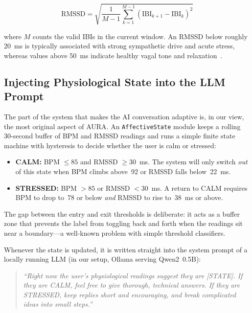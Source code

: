 \documentclass[conference]{IEEEtran}
\begin{document}
\begin{equation}
\label{eq:rmssd}
\text{RMSSD} = \sqrt{\frac{1}{M-1} \sum_{k=1}^{M-1}
  \left(\text{IBI}_{k+1} - \text{IBI}_k\right)^{2}}
\end{equation}

\noindent where $M$ counts the valid IBIs in the current window.
An RMSSD below roughly 20~ms is typically associated with strong
sympathetic drive and acute stress, whereas values above 50~ms
indicate healthy vagal tone and relaxation~\cite{shaffer2017overview,
thayer2012meta}.

\subsection{Injecting Physiological State into the LLM Prompt}

The part of the system that makes the AI conversation adaptive
is, in our view, the most original aspect of \textsc{AURA}.
An \texttt{AffectiveState} module keeps a rolling 30-second
buffer of BPM and RMSSD readings and runs a simple finite state
machine with hysteresis to decide whether the user is calm or
stressed:

\begin{itemize}
  \item \textbf{CALM:} BPM $\leq 85$ and RMSSD $\geq 30$~ms.
        The system will only switch \emph{out} of this state when
        BPM climbs above~92 or RMSSD falls below~22~ms.
  \item \textbf{STRESSED:} BPM $> 85$ or RMSSD $< 30$~ms.
        A return to CALM requires BPM to drop to~78 or below
        \emph{and} RMSSD to rise to~38~ms or above.
\end{itemize}

The gap between the entry and exit thresholds is deliberate: it
acts as a buffer zone that prevents the label from toggling back
and forth when the readings sit near a boundary---a well-known
problem with simple threshold classifiers.

Whenever the state is updated, it is written straight into the
system prompt of a locally running LLM (in our setup, Ollama
\cite{ollama2024} serving Qwen2~0.5B):

\begin{quote}
  \textit{``Right now the user's physiological readings suggest
  they are [STATE]. If they are CALM, feel free to give thorough,
  technical answers. If they are STRESSED, keep replies short and
  encouraging, and break complicated ideas into small steps.''}
\end{quote}
\end{document}
